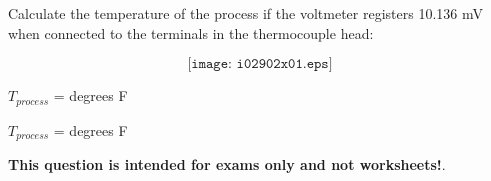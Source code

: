 

Calculate the temperature of the process if the voltmeter registers 10.136 mV when connected to the terminals in the thermocouple head:

$$\texttt{[image: i02902x01.eps]}$$

$T_{process}$ = \underbar{\hskip 50pt} degrees F







$T_{process}$ =  degrees F
 






{\bf This question is intended for exams only and not worksheets!}.



